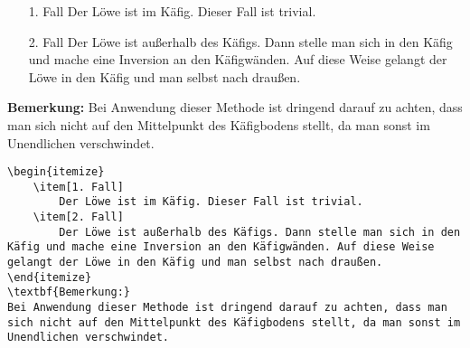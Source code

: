 \begin{frame}[fragile]
	\vspace{-0.2cm}
	\Losung
	\begin{outputbox}
		\vspace{-0.2cm}
		\begin{itemize}
			\item[1. Fall]
				Der Löwe ist im Käfig. Dieser Fall ist trivial.
			\item[2. Fall]
				Der Löwe ist außerhalb des Käfigs. Dann stelle man sich in den Käfig und mache eine Inversion an den Käfigwänden. Auf diese Weise gelangt der Löwe in den Käfig und man selbst nach draußen.
		\end{itemize}
		\vspace{-0.2cm}
		\textbf{Bemerkung:}
		Bei Anwendung dieser Methode ist dringend darauf zu achten, dass man sich nicht auf den Mittelpunkt des Käfigbodens stellt, da man sonst im Unendlichen verschwindet.
	\end{outputbox}
	
	\Code
	\vspace{-0.1cm}
	\begin{lstlisting}
\begin{itemize}
	\item[1. Fall]
		Der Löwe ist im Käfig. Dieser Fall ist trivial.
	\item[2. Fall]
		Der Löwe ist außerhalb des Käfigs. Dann stelle man sich in den Käfig und mache eine Inversion an den Käfigwänden. Auf diese Weise gelangt der Löwe in den Käfig und man selbst nach draußen.
\end{itemize}
\textbf{Bemerkung:}
Bei Anwendung dieser Methode ist dringend darauf zu achten, dass man sich nicht auf den Mittelpunkt des Käfigbodens stellt, da man sonst im Unendlichen verschwindet.
	\end{lstlisting}
\end{frame}
